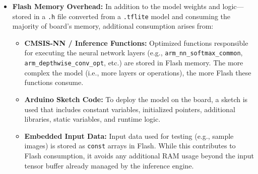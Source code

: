 \begin{itemize}
    \item \textbf{Flash Memory Overhead:} In addition to the model weights and logic—stored in a \texttt{.h} file converted from a \texttt{.tflite} model and consuming the majority of board's memory, additional consumption arises from:
    \begin{itemize}
    
        \item \textbf{CMSIS-NN / Inference Functions:} Optimized functions responsible for executing the neural network layers (e.g., \texttt{arm\_nn\_softmax\_common}, \texttt{arm\_depthwise\_conv\_opt}, etc.) are stored in Flash memory. The more complex the model (i.e., more layers or operations), the more Flash these functions consume.
        
        \item \textbf{Arduino Sketch Code:} To deploy the model on the board, a sketch is used that includes constant variables, initialized pointers, additional libraries, static variables, and runtime logic. 

        \item \textbf{Embedded Input Data:} Input data used for testing (e.g., sample images) is stored as \texttt{const} arrays in Flash. While this contributes to Flash consumption, it avoids any additional RAM usage beyond the input tensor buffer already managed by the inference engine.

    \end{itemize}
\end{itemize}

\bigskip

